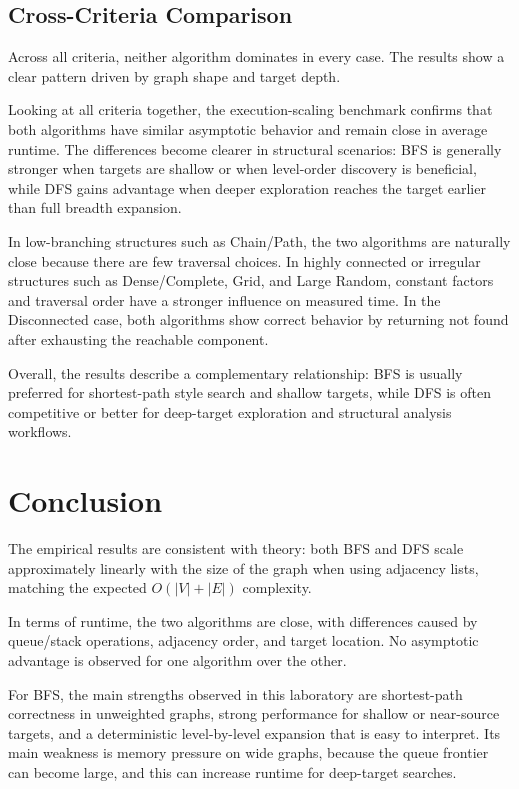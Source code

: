 \documentclass{labreport}
\begin{document}
\subsection{Cross-Criteria Comparison}
Across all criteria, neither algorithm dominates in every case. The results show a clear pattern driven by graph shape and target depth.

Looking at all criteria together, the execution-scaling benchmark confirms that both algorithms have similar asymptotic behavior and remain close in average runtime. The differences become clearer in structural scenarios: BFS is generally stronger when targets are shallow or when level-order discovery is beneficial, while DFS gains advantage when deeper exploration reaches the target earlier than full breadth expansion.

In low-branching structures such as Chain/Path, the two algorithms are naturally close because there are few traversal choices. In highly connected or irregular structures such as Dense/Complete, Grid, and Large Random, constant factors and traversal order have a stronger influence on measured time. In the Disconnected case, both algorithms show correct behavior by returning not found after exhausting the reachable component.

Overall, the results describe a complementary relationship: BFS is usually preferred for shortest-path style search and shallow targets, while DFS is often competitive or better for deep-target exploration and structural analysis workflows.

\section{Conclusion}
The empirical results are consistent with theory: both BFS and DFS scale approximately linearly with the size of the graph when using adjacency lists, matching the expected $O(|V|+|E|)$ complexity.

In terms of runtime, the two algorithms are close, with differences caused by queue/stack operations, adjacency order, and target location. No asymptotic advantage is observed for one algorithm over the other.

For BFS, the main strengths observed in this laboratory are shortest-path correctness in unweighted graphs, strong performance for shallow or near-source targets, and a deterministic level-by-level expansion that is easy to interpret. Its main weakness is memory pressure on wide graphs, because the queue frontier can become large, and this can increase runtime for deep-target searches.
\end{document}
